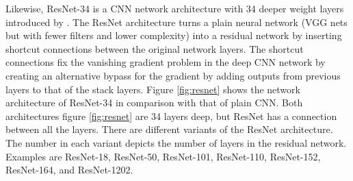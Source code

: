 \documentclass[conference]{IEEEtran}
\begin{document}
Likewise, ResNet-34 is a CNN network architecture with 34 deeper weight layers introduced by \cite{he2016deep}. The ResNet architecture turns a plain neural network (VGG nets but with fewer filters and lower complexity) into a residual network by inserting shortcut connections between the original network layers. The shortcut connections fix the vanishing gradient problem in the deep CNN network by creating an alternative bypass for the gradient by adding outputs from previous layers to that of the stack layers. Figure \ref{fig:resnet} shows the network architecture of ResNet-34 in comparison with that of plain CNN. Both architectures figure \ref{fig:resnet} are 34 layers deep, but ResNet has a connection between all the layers.
There are different variants of the ResNet architecture. The number in each variant depicts the number of layers in the residual network. Examples are ResNet-18, ResNet-50, ResNet-101, ResNet-110, ResNet-152, ResNet-164, and ResNet-1202.
\end{document}
